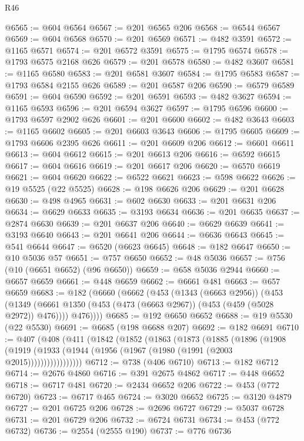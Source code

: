 \begin{lexlean}{R46}
\begin{coremodule}
@6565 := @604 @6564
@6567 := @201 @6565 @206
@6568 := @6544 @6567
@6569 := @604 @6568
@6570 := @201 @6569
@6571 := @482 @3591
@6572 := @1165 @6571
@6574 := @201 @6572 @3591
@6575 := @1795 @6574
@6578 := @1793 @6575 @2168 @626
@6579 := @201 @6578
@6580 := @482 @3607
@6581 := @1165 @6580
@6583 := @201 @6581 @3607
@6584 := @1795 @6583
@6587 := @1793 @6584 @2155 @626
@6589 := @201 @6587 @206
@6590 := @6579 @6589
@6591 := @604 @6590
@6592 := @201 @6591
@6593 := @482 @3627
@6594 := @1165 @6593
@6596 := @201 @6594 @3627
@6597 := @1795 @6596
@6600 := @1793 @6597 @2902 @626
@6601 := @201 @6600
@6602 := @482 @3643
@6603 := @1165 @6602
@6605 := @201 @6603 @3643
@6606 := @1795 @6605
@6609 := @1793 @6606 @2395 @626
@6611 := @201 @6609 @206
@6612 := @6601 @6611
@6613 := @604 @6612
@6615 := @201 @6613 @206
@6616 := @6592 @6615
@6617 := @604 @6616
@6619 := @201 @6617 @206
@6620 := @6570 @6619
@6621 := @604 @6620
@6622 := @6522 @6621
@6623 := @598 @6622
@6626 := @19 @5525 (@22 @5525)
@6628 := @198 @6626 @206
@6629 := @201 @6628
@6630 := @498 @4965
@6631 := @602 @6630
@6633 := @201 @6631 @206
@6634 := @6629 @6633
@6635 := @3193 @6634
@6636 := @201 @6635
@6637 := @2874 @6630
@6639 := @201 @6637 @206
@6640 := @6629 @6639
@6641 := @3193 @6640
@6643 := @201 @6641 @206
@6644 := @6636 @6643
@6645 := @541 @6644
@6647 := @6520 (@6623 @6645)
@6648 := @182 @6647
@6650 := @10 @5036 @57
@6651 := @757 @6650
@6652 := @48 @5036
@6657 := @756 (@10 (@6651 @6652) (@96 @6650))
@6659 := @658 @5036 @2944
@6660 := @6657 @6659
@6661 := @448 @6659
@6662 := @6661 @481
@6663 := @657 @6659
@6683 := @182
    (@6660
      (@6662
        (@453
          (@1343 (@6663 @2956))
          (@453
            (@1349 (@6661 @1350 (@453 (@473 (@6663 @2967)) (@453 (@459 (@5028 @2972)) @476))))
            @476))))
@6685 := @192 @6650 @6652
@6688 := @19 @5530 (@22 @5530)
@6691 := @6685 (@198 @6688 @207)
@6692 := @182 @6691
@6710 := @407
    (@408
      (@411
        (@1842
          (@1852
            (@1863
              (@1873
                (@1885
                  (@1896
                    (@1908
                      (@1919 (@1933 (@1944 (@1956 (@1967 (@1980 (@1991 (@2003 @2015)))))))))))))))))
@6712 := @738 (@406 @6710)
@6713 := @182 @6712
@6714 := @2676 @4860
@6716 := @391 @2675 @4862
@6717 := @448 @6652
@6718 := @6717 @481
@6720 := @2434 @6652 @206
@6722 := @453 (@772 @6720)
@6723 := @6717 @465
@6724 := @3020 @6652
@6725 := @3120 @4879
@6727 := @201 @6725 @206
@6728 := @2696 @6727
@6729 := @5037 @6728
@6731 := @201 @6729 @206
@6732 := @6724 @6731
@6734 := @453 (@772 @6732)
@6736 := @2554 (@2555 @190)
@6737 := @776 @6736

\end{coremodule}
\end{lexlean}
